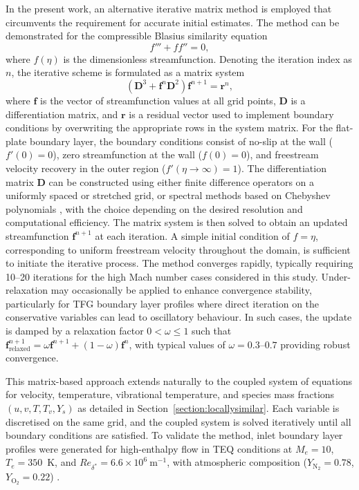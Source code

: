 In the present work, an alternative iterative matrix method is employed that circumvents the requirement for accurate initial estimates. The method can be demonstrated for the compressible Blasius similarity equation
\begin{equation}
    f''' + ff'' = 0,
\end{equation}
where $f(\eta)$ is the dimensionless streamfunction. Denoting the iteration index as $n$, the iterative scheme is formulated as a matrix system
\begin{equation}
    \left( \mathbf{D}^3 + \mathbf{f}^n \mathbf{D}^2 \right) \mathbf{f}^{n+1} = \mathbf{r}^n,
\end{equation}
where $\mathbf{f}$ is the vector of streamfunction values at all grid points, $\mathbf{D}$ is a differentiation matrix, and $\mathbf{r}$ is a residual vector used to implement boundary conditions by overwriting the appropriate rows in the system matrix. For the flat-plate boundary layer, the boundary conditions consist of no-slip at the wall ($f'(0) = 0$), zero streamfunction at the wall ($f(0) = 0$), and freestream velocity recovery in the outer region ($f'(\eta \to \infty) = 1$). The differentiation matrix $\mathbf{D}$ can be constructed using either finite difference operators on a uniformly spaced or stretched grid, or spectral methods based on Chebyshev polynomials \citep{Boyd2001,Trefethen2000}, with the choice depending on the desired resolution and computational efficiency. The matrix system is then solved to obtain an updated streamfunction $\mathbf{f}^{n+1}$ at each iteration. A simple initial condition of $f = \eta$, corresponding to uniform freestream velocity throughout the domain, is sufficient to initiate the iterative process. The method converges rapidly, typically requiring 10--20 iterations for the high Mach number cases considered in this study. Under-relaxation may occasionally be applied to enhance convergence stability, particularly for \gls{TFG} boundary layer profiles where direct iteration on the conservative variables can lead to oscillatory behaviour. In such cases, the update is damped by a relaxation factor $0 < \omega \leq 1$ such that $\mathbf{f}^{n+1}_{\text{relaxed}} = \omega \mathbf{f}^{n+1} + (1-\omega)\mathbf{f}^{n}$, with typical values of $\omega = 0.3$--$0.7$ providing robust convergence.


This matrix-based approach extends naturally to the coupled system of equations for velocity, temperature, vibrational temperature, and species mass fractions $(u, v, T, T_v, Y_s)$ as detailed in Section~\ref{section:locallysimilar}. Each variable is discretised on the same grid, and the coupled system is solved iteratively until all boundary conditions are satisfied. To validate the method, inlet boundary layer profiles were generated for high-enthalpy flow in \gls{TEQ} conditions at $M_e = 10$, $T_e = 350$~K, and $Re_{\delta^*} = 6.6 \times 10^6~\mathrm{m}^{-1}$, with atmospheric composition ($Y_{\mathrm{N}_2} = 0.78$, $Y_{\mathrm{O}_2} = 0.22$) \citep{Hudson1997}.

